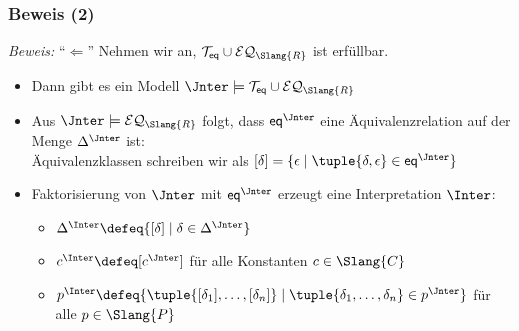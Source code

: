 \documentclass[aspectratio=1610,onlymath]{beamer}
\begin{document}
\begin{frame}[t]\frametitle{Beweis (2)}


\emph{Beweis:} "`$\Leftarrow$"' Nehmen wir an, $\mathcal{T}_{\eqpred}\cup\mathcal{EQ}_{\Slang{R}}$ ist erfüllbar.\pause
\begin{itemize}
\item Dann gibt es ein Modell $\Jnter\models\mathcal{T}_{\eqpred}\cup\mathcal{EQ}_{\Slang{R}}$\pause
\item Aus $\Jnter\models\mathcal{EQ}_{\Slang{R}}$ folgt, dass $\eqpred^\Jnter$ eine Äquivalenzrelation auf der Menge $\Delta^\Jnter$ ist:\\
Äquivalenzklassen schreiben wir als $[\delta]=\{\epsilon\mid \tuple{\delta,\epsilon}\in\eqpred^\Jnter\}$\pause
\item Faktorisierung von $\Jnter$ mit $\eqpred^\Jnter$ erzeugt eine Interpretation $\Inter$:
	\begin{itemize}
	\item $\Delta^\Inter\defeq\{[\delta]\mid \delta\in\Delta^\Jnter\}$
	\item $c^\Inter\defeq[c^\Jnter]$ für alle Konstanten $c\in\Slang{C}$
	\item $p^\Inter\defeq\{\tuple{[\delta_1],\ldots,[\delta_n]}\mid \tuple{\delta_1,\ldots,\delta_n}\in p^\Jnter\}$ für alle $p\in\Slang{P}$ 
	\end{itemize}

\end{itemize}


\end{frame}
\end{document}
